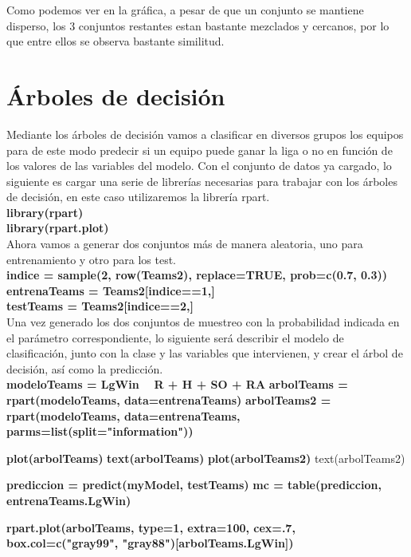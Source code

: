 \documentclass[10pt]{article}
\begin{document}
Como podemos ver en la gráfica, a pesar de que un conjunto se mantiene disperso, los 3 conjuntos restantes estan bastante mezclados y cercanos, por lo que entre ellos se observa bastante similitud.


\section{Árboles de decisión}

Mediante los árboles de decisión vamos a clasificar en diversos grupos los equipos para de este modo predecir si un equipo puede ganar la liga o no en función de los valores de las variables del modelo. Con el conjunto de datos ya cargado, lo siguiente es cargar una serie de librerías necesarias para trabajar con los árboles de decisión, en este caso utilizaremos la librería rpart. \\

\textbf{library(rpart)} \\
\textbf{library(rpart.plot)} \\

Ahora vamos a generar dos conjuntos más de manera aleatoria, uno para entrenamiento y otro para los test. \\

\textbf{indice = sample(2, row(Teams2), replace=TRUE, prob=c(0.7, 0.3))} \\
\textbf{entrenaTeams = Teams2[indice==1,]} \\
\textbf{testTeams = Teams2[indice==2,]}\\

Una vez generado los dos conjuntos de muestreo con la probabilidad indicada en el parámetro correspondiente, lo siguiente será describir el modelo de clasificación, junto con la clase y las variables que intervienen, y crear el árbol de decisión, así como la predicción.\\

\textbf{modeloTeams = LgWin ~ R + H + SO + RA}
\textbf{arbolTeams = rpart(modeloTeams, data=entrenaTeams)}
\textbf{arbolTeams2 = rpart(modeloTeams, data=entrenaTeams, parms=list(split="information"))}

\textbf{plot(arbolTeams)}
\textbf{text(arbolTeams)}
\textbf{plot(arbolTeams2)}
text(arbolTeams2)

\textbf{prediccion = predict(myModel, testTeams)}
\textbf{mc = table(prediccion, entrenaTeams.LgWin)}

\textbf{rpart.plot(arbolTeams, type=1, extra=100, cex=.7, box.col=c("gray99", "gray88")[arbolTeams.LgWin])}\\
\end{document}
